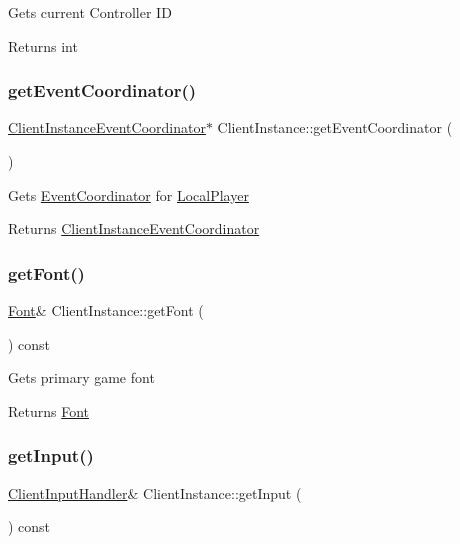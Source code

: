 Gets current Controller ID \begin{DoxyReturn}{Returns}
int 
\end{DoxyReturn}
\mbox{\label{struct_client_instance_a3135a3b7826f22211bf69d688a8ac81b}} 
\subsubsection{\texorpdfstring{getEventCoordinator()}{getEventCoordinator()}}
{\footnotesize\ttfamily \mbox{\hyperlink{struct_client_instance_event_coordinator}{Client\+Instance\+Event\+Coordinator}}$\ast$ Client\+Instance\+::get\+Event\+Coordinator (\begin{DoxyParamCaption}{ }\end{DoxyParamCaption})}

Gets \mbox{\hyperlink{struct_event_coordinator}{Event\+Coordinator}} for \mbox{\hyperlink{class_local_player}{Local\+Player}} \begin{DoxyReturn}{Returns}
\mbox{\hyperlink{struct_client_instance_event_coordinator}{Client\+Instance\+Event\+Coordinator}} 
\end{DoxyReturn}
\mbox{\label{struct_client_instance_a203b51aeab4a317a4e491af589b43eaa}} 
\subsubsection{\texorpdfstring{getFont()}{getFont()}}
{\footnotesize\ttfamily \mbox{\hyperlink{struct_font}{Font}}\& Client\+Instance\+::get\+Font (\begin{DoxyParamCaption}{ }\end{DoxyParamCaption}) const}

Gets primary game font \begin{DoxyReturn}{Returns}
\mbox{\hyperlink{struct_font}{Font}} 
\end{DoxyReturn}
\mbox{\label{struct_client_instance_a34c87a5603c81ffcc160f97bc6006949}} 
\subsubsection{\texorpdfstring{getInput()}{getInput()}}
{\footnotesize\ttfamily \mbox{\hyperlink{struct_client_input_handler}{Client\+Input\+Handler}}\& Client\+Instance\+::get\+Input (\begin{DoxyParamCaption}{ }\end{DoxyParamCaption}) const}


